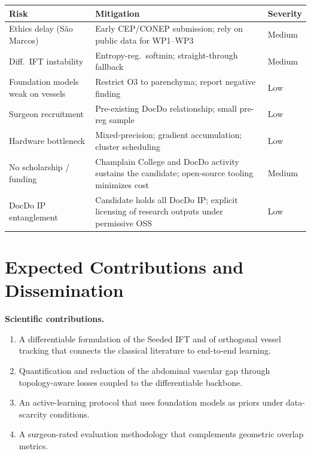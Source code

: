 \documentclass[a4paper,11pt,twoside]{article}
\begin{document}
\begin{center}\small
\begin{tabularx}{\linewidth}{@{}lXl@{}}
\toprule
Risk & Mitigation & Severity \\
\midrule
Ethics delay (S\~ao Marcos)        & Early CEP/CONEP submission; rely on public data for WP1--WP3 & Medium \\
Diff.\ IFT instability             & Entropy-reg.\ softmin; straight-through fallback & Medium \\
Foundation models weak on vessels  & Restrict O3 to parenchyma; report negative finding & Low \\
Surgeon recruitment                & Pre-existing DocDo relationship; small pre-reg sample & Low \\
Hardware bottleneck                & Mixed-precision; gradient accumulation; cluster scheduling & Low \\
No scholarship / funding           & Champlain College and DocDo activity sustains the candidate; open-source tooling minimizes cost & Medium \\
DocDo IP entanglement              & Candidate holds all DocDo IP; explicit licensing of research outputs under permissive OSS & Low \\
\bottomrule
\end{tabularx}
\end{center}

\section{Expected Contributions and Dissemination}

\textbf{Scientific contributions.}
\begin{enumerate}[label=(C\arabic*), noitemsep, topsep=3pt]
  \item A differentiable formulation of the Seeded IFT and of orthogonal
        vessel tracking that connects the classical literature to end-to-end
        learning.
  \item Quantification and reduction of the abdominal vascular gap through
        topology-aware losses coupled to the differentiable backbone.
  \item An active-learning protocol that uses foundation models as priors
        under data-scarcity conditions.
  \item A surgeon-rated evaluation methodology that complements geometric
        overlap metrics.
\end{enumerate}
\end{document}
